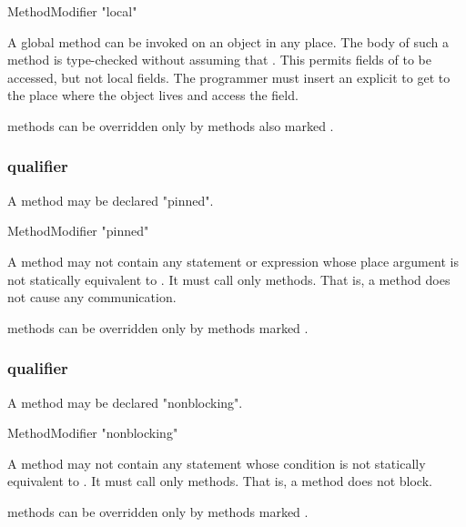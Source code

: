 \begin{grammar}
  MethodModifier \: \xcd"local"  
\end{grammar}

A global method can be invoked on an object  in any place. The
body of such a method is type-checked without assuming that
. This permits  fields of  to
be accessed, but not local fields. The programmer must insert an explicit
 to get to the place where the object lives and access
the field.

 methods can be overridden only by methods also marked .

\subsubsection{ qualifier}
\label{PinnedAnnotation}
\label{PinnedMethod}

A method may be declared \xcd"pinned".

\begin{grammar}
  MethodModifier \: \xcd"pinned"  
\end{grammar}

A  method may not
contain any  statement or expression whose place argument
is not statically equivalent to . It must call only
 methods. That is, a  method does not cause
any communication.

 methods can be overridden only by methods marked .

\subsubsection{ qualifier}
\label{NonblockingAnnotation}
\label{NonblockingMethod}

A method may be declared \xcd"nonblocking".

\begin{grammar}
  MethodModifier \: \xcd"nonblocking"  
\end{grammar}

A  method may not
contain any  statement whose condition
is not statically equivalent to . It must call only
 methods. That is, a  method does not block.

 methods can be overridden only by methods marked .

